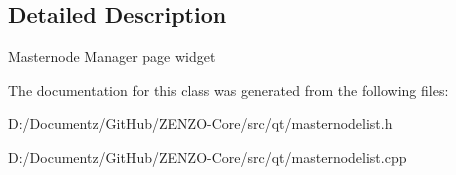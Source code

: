 \subsection{Detailed Description}
Masternode Manager page widget 

The documentation for this class was generated from the following files\+:\begin{DoxyCompactItemize}
\item 
D\+:/\+Documentz/\+Git\+Hub/\+Z\+E\+N\+Z\+O-\/\+Core/src/qt/masternodelist.\+h\item 
D\+:/\+Documentz/\+Git\+Hub/\+Z\+E\+N\+Z\+O-\/\+Core/src/qt/masternodelist.\+cpp\end{DoxyCompactItemize}
